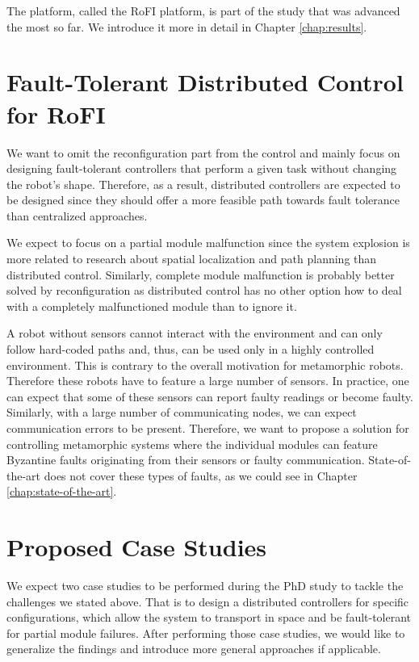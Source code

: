 The platform, called the RoFI platform, is part of the study that was advanced
the most so far. We introduce it more in detail in Chapter \ref{chap:results}.

\section{Fault-Tolerant Distributed Control for RoFI}

We want to omit the reconfiguration part from the control and mainly focus on
designing fault-tolerant controllers that perform a given task without changing
the robot's shape. Therefore, as a result, distributed controllers are expected
to be designed since they should offer a more feasible path towards fault
tolerance than centralized approaches.

We expect to focus on a partial module malfunction since the system explosion is
more related to research about spatial localization and path planning than
distributed control. Similarly, complete module malfunction is probably better
solved by reconfiguration as distributed control has no other option how to deal
with a completely malfunctioned module than to ignore it.

A robot without sensors cannot interact with the environment and can only follow
hard-coded paths and, thus, can be used only in a highly controlled environment.
This is contrary to the overall motivation for metamorphic robots. Therefore
these robots have to feature a large number of sensors. In practice, one can
expect that some of these sensors can report faulty readings or become faulty.
Similarly, with a large number of communicating nodes, we can expect
communication errors to be present. Therefore, we want to propose a solution for
controlling metamorphic systems where the individual modules can feature
Byzantine faults originating from their sensors or faulty communication.
State-of-the-art does not cover these types of faults, as we could see in
Chapter \ref{chap:state-of-the-art}.

\section{Proposed Case Studies}

We expect two case studies to be performed during the PhD study to tackle the
challenges we stated above. That is to design a distributed controllers for
specific configurations, which allow the system to transport in space and be
fault-tolerant for partial module failures. After performing those case studies,
we would like to generalize the findings and introduce more general
approaches if applicable.

